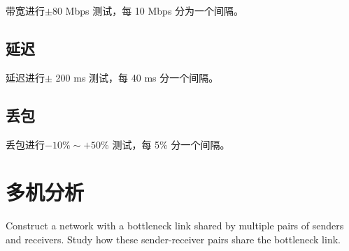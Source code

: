     带宽进行$\pm $80 Mbps 测试，每 10 Mbps 分为一个间隔。

    \subsection{延迟}

    延迟进行$\pm$ 200 ms 测试，每 40 ms 分一个间隔。

    \subsection{丢包}

    丢包进行$-10\%\sim +50\%$ 测试，每 5\% 分一个间隔。

    \section{多机分析}

    Construct a network with a bottleneck link shared by multiple pairs of senders and receivers. Study how these sender-receiver pairs share the bottleneck link.



